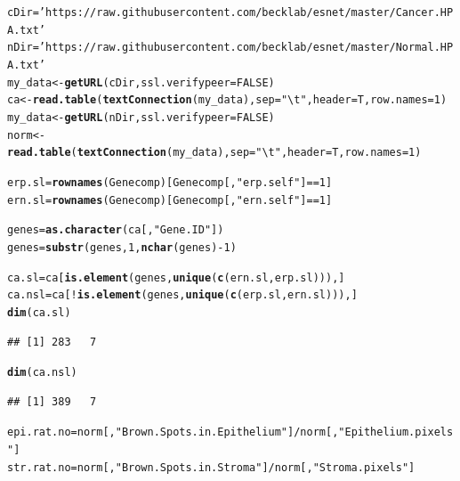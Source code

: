 \documentclass{article}\usepackage[]{graphicx}\usepackage[]{color}
\makeatletter
\newcommand{\hlnum}[1]{\textcolor[rgb]{0.686,0.059,0.569}{#1}}%
\newcommand{\hlstr}[1]{\textcolor[rgb]{0.192,0.494,0.8}{#1}}%
\newcommand{\hlopt}[1]{\textcolor[rgb]{0,0,0}{#1}}%
\newcommand{\hlstd}[1]{\textcolor[rgb]{0.345,0.345,0.345}{#1}}%
\newcommand{\hlkwb}[1]{\textcolor[rgb]{0.69,0.353,0.396}{#1}}%
\newcommand{\hlkwc}[1]{\textcolor[rgb]{0.333,0.667,0.333}{#1}}%
\newcommand{\hlkwd}[1]{\textcolor[rgb]{0.737,0.353,0.396}{\textbf{#1}}}%
\newenvironment{kframe}{%
 \def\at@end@of@kframe{}%
 \ifinner\ifhmode%
  \def\at@end@of@kframe{\end{minipage}}%
  \begin{minipage}{\columnwidth}%
 \fi\fi%
 \def\FrameCommand##1{\hskip\@totalleftmargin \hskip-\fboxsep
 \colorbox{shadecolor}{##1}\hskip-\fboxsep
     \hskip-\linewidth \hskip-\@totalleftmargin \hskip\columnwidth}%
 \MakeFramed {\advance\hsize-\width
   \@totalleftmargin\z@ \linewidth\hsize
   \@setminipage}}%
 {\par\unskip\endMakeFramed%
 \at@end@of@kframe}
\newenvironment{knitrout}{}{} %
\makeatother
\begin{document}
\begin{knitrout}
\color{fgcolor}\begin{kframe}
\begin{alltt}
\hlstd{cDir}\hlkwb{=} \hlstr{'https://raw.githubusercontent.com/becklab/esnet/master/Cancer.HPA.txt'}
\hlstd{nDir} \hlkwb{=} \hlstr{'https://raw.githubusercontent.com/becklab/esnet/master/Normal.HPA.txt'}
\hlstd{my_data} \hlkwb{<-} \hlkwd{getURL}\hlstd{(cDir,}\hlkwc{ssl.verifypeer}\hlstd{=}\hlnum{FALSE}\hlstd{)}
\hlstd{ca} \hlkwb{<-} \hlkwd{read.table}\hlstd{(}\hlkwd{textConnection}\hlstd{(my_data),}\hlkwc{sep}\hlstd{=}\hlstr{"\textbackslash{}t"}\hlstd{,}\hlkwc{header}\hlstd{=T,}\hlkwc{row.names}\hlstd{=}\hlnum{1}\hlstd{)}
\hlstd{my_data} \hlkwb{<-} \hlkwd{getURL}\hlstd{(nDir,}\hlkwc{ssl.verifypeer}\hlstd{=}\hlnum{FALSE}\hlstd{)}
\hlstd{norm} \hlkwb{<-} \hlkwd{read.table}\hlstd{(}\hlkwd{textConnection}\hlstd{(my_data),}\hlkwc{sep}\hlstd{=}\hlstr{"\textbackslash{}t"}\hlstd{,}\hlkwc{header}\hlstd{=T,}\hlkwc{row.names}\hlstd{=}\hlnum{1}\hlstd{)}

\hlstd{erp.sl}\hlkwb{=}\hlkwd{rownames}\hlstd{(Genecomp)[Genecomp[,}\hlstr{"erp.self"}\hlstd{]}\hlopt{==}\hlnum{1}\hlstd{]}
\hlstd{ern.sl}\hlkwb{=}\hlkwd{rownames}\hlstd{(Genecomp)[Genecomp[,}\hlstr{"ern.self"}\hlstd{]}\hlopt{==}\hlnum{1}\hlstd{]}

\hlstd{genes}\hlkwb{=}\hlkwd{as.character}\hlstd{(ca[,}\hlstr{"Gene.ID"}\hlstd{])}
\hlstd{genes}\hlkwb{=}\hlkwd{substr}\hlstd{(genes,}\hlnum{1}\hlstd{,}\hlkwd{nchar}\hlstd{(genes)}\hlopt{-}\hlnum{1}\hlstd{)}

\hlstd{ca.sl}\hlkwb{=}\hlstd{ca[}\hlkwd{is.element}\hlstd{(genes,}\hlkwd{unique}\hlstd{(}\hlkwd{c}\hlstd{(ern.sl,erp.sl))),]}
\hlstd{ca.nsl}\hlkwb{=}\hlstd{ca[}\hlopt{!}\hlkwd{is.element}\hlstd{(genes,}\hlkwd{unique}\hlstd{(}\hlkwd{c}\hlstd{(erp.sl,ern.sl))),]}
\hlkwd{dim}\hlstd{(ca.sl)}
\end{alltt}
\begin{verbatim}
## [1] 283   7
\end{verbatim}
\begin{alltt}
\hlkwd{dim}\hlstd{(ca.nsl)}
\end{alltt}
\begin{verbatim}
## [1] 389   7
\end{verbatim}
\begin{alltt}
\hlstd{epi.rat.no}\hlkwb{=}\hlstd{norm[,}\hlstr{"Brown.Spots.in.Epithelium"}\hlstd{]}\hlopt{/}\hlstd{norm[,}\hlstr{"Epithelium.pixels"}\hlstd{]}
\hlstd{str.rat.no}\hlkwb{=}\hlstd{norm[,}\hlstr{"Brown.Spots.in.Stroma"}\hlstd{]}\hlopt{/}\hlstd{norm[,}\hlstr{"Stroma.pixels"}\hlstd{]}


\end{alltt}
\end{kframe}
\end{knitrout}
\end{document}
